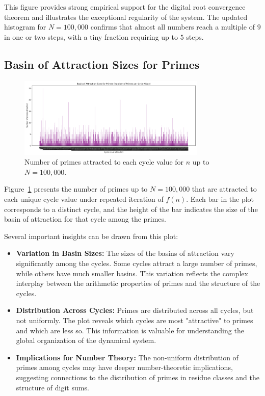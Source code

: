 \documentclass[12pt]{article}
\begin{document}
This figure provides strong empirical support for the digital root convergence theorem and illustrates the exceptional regularity of the system. The updated histogram for $N=100,000$ confirms that almost all numbers reach a multiple of $9$ in one or two steps, with a tiny fraction requiring up to $5$ steps.

\subsection{Basin of Attraction Sizes for Primes}
\begin{figure}[H]
    \centering
    \includegraphics[width=0.8\textwidth]{fig_basin_attraction_primes.png}
    \caption{Number of primes attracted to each cycle value for $n$ up to $N=100,000$.}
    \label{fig:basin_attraction}
\end{figure}

Figure~\ref{fig:basin_attraction} presents the number of primes up to $N=100,000$ that are attracted to each unique cycle value under repeated iteration of $f(n)$. Each bar in the plot corresponds to a distinct cycle, and the height of the bar indicates the size of the basin of attraction for that cycle among the primes.

Several important insights can be drawn from this plot:
\begin{itemize}
    \item \textbf{Variation in Basin Sizes:} The sizes of the basins of attraction vary significantly among the cycles. Some cycles attract a large number of primes, while others have much smaller basins. This variation reflects the complex interplay between the arithmetic properties of primes and the structure of the cycles.
    \item \textbf{Distribution Across Cycles:} Primes are distributed across all cycles, but not uniformly. The plot reveals which cycles are most "attractive" to primes and which are less so. This information is valuable for understanding the global organization of the dynamical system.
    \item \textbf{Implications for Number Theory:} The non-uniform distribution of primes among cycles may have deeper number-theoretic implications, suggesting connections to the distribution of primes in residue classes and the structure of digit sums.
\end{itemize}
\end{document}
